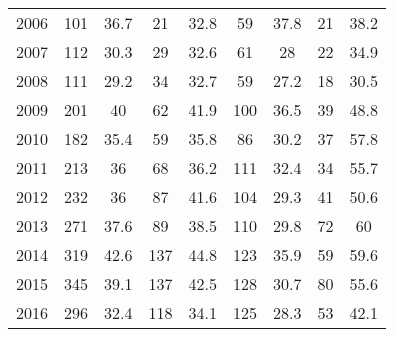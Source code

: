 \begin{table}[htbp]
\begin{tabular}{l*{8}{c}}
2006      &      101&     36.7&       21&     32.8&       59&     37.8&       21&     38.2\\
2007      &      112&     30.3&       29&     32.6&       61&       28&       22&     34.9\\
2008      &      111&     29.2&       34&     32.7&       59&     27.2&       18&     30.5\\
2009      &      201&       40&       62&     41.9&      100&     36.5&       39&     48.8\\
2010      &      182&     35.4&       59&     35.8&       86&     30.2&       37&     57.8\\
2011      &      213&       36&       68&     36.2&      111&     32.4&       34&     55.7\\
2012      &      232&       36&       87&     41.6&      104&     29.3&       41&     50.6\\
2013      &      271&     37.6&       89&     38.5&      110&     29.8&       72&       60\\
2014      &      319&     42.6&      137&     44.8&      123&     35.9&       59&     59.6\\
2015      &      345&     39.1&      137&     42.5&      128&     30.7&       80&     55.6\\
2016      &      296&     32.4&      118&     34.1&      125&     28.3&       53&     42.1\\
\hline\hline
\end{tabular}
\end{table}
